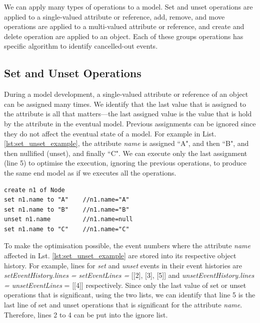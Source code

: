\documentclass{llncs}
\begin{document}
We can apply many types of operations to a model. Set and unset operations are applied to a single-valued attribute or reference, add, remove, and move operations are applied to a multi-valued attribute or reference, and create and delete operation are applied to an object. Each of these groups operations has specific algorithm to identify cancelled-out events. 

\subsection{Set and Unset Operations}
\label{subsec:set_and_unset_operations}
During a model development, a single-valued attribute or reference of an object can be assigned many times. We identify that the last value that is assigned to the attribute is all that matters---the last assigned value is the value that is hold by the attribute in the eventual model. Previous assignments can be ignored since they do not affect the eventual state of a model. For example in List. \ref{lst:set_unset_example}, the attribute \emph{name} is assigned ``A", and then ``B", and then nullified (unset), and finally ``C". We can execute only the last assignment (line 5) to optimise the execution, ignoring the previous operations, to produce the same end model as if we executes all the operations. 

\begin{lstlisting}[style=eol,caption={Example of CBP representation of \emph{name} attribute assignments.},label=lst:set_unset_example]
create n1 of Node
set n1.name to "A"    //n1.name="A"    
set n1.name to "B"    //n1.name="B"
unset n1.name         //n1.name=null
set n1.name to "C"    //n1.name="C"
\end{lstlisting}

To make the optimisation possible, the event numbers where the attribute \emph{name} affected in Lst. \ref{lst:set_unset_example} are stored into its respective object history.  For example, lines for \emph{set} and \emph{unset} events in their event histories are \emph{setEventHistory.lines = setEventLines =} [[2], [3], [5]] and \emph{unsetEventHistory.lines = unsetEventLines} = [[4]] respectively. Since only the last value of set or unset operations that is significant, using the two lists, we can identify that line 5 is the last line of set and unset operations that is significant for the attribute \emph{name}. Therefore, lines 2 to 4 can be put into the ignore list.  
\end{document}
